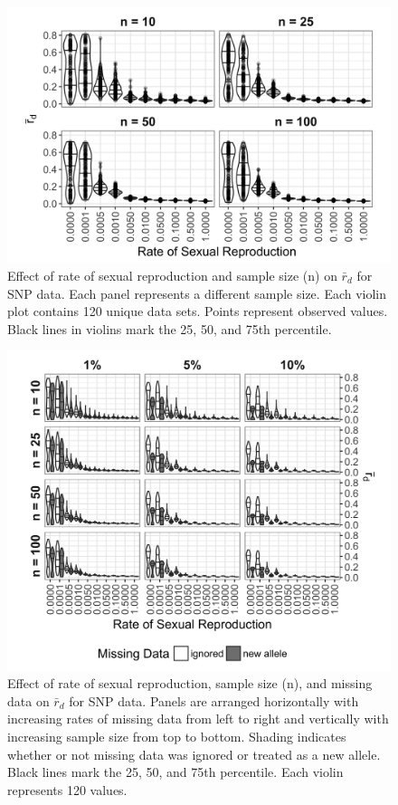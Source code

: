 \documentclass[double,11pt]{beavtex}
\begin{document}
  \begin{figure}
  
  {\centering \includegraphics[width=0.8\linewidth]{figure/simulations/genomic_rd} 
  
  }
  
  \caption[Effect of rate of sexual reproduction and sample size on \(\bar{r}_d\)
  for SNP data.]{Effect of rate of sexual reproduction and sample size (n) on
  \(\bar{r}_d\) for SNP data. Each panel represents a different sample
  size. Each violin plot contains 120 unique data sets. Points represent
  observed values. Black lines in violins mark the 25, 50, and 75th
  percentile.}\label{fig:sim5}
  \end{figure}
  
  \begin{figure}
  
  {\centering \includegraphics[width=0.8\linewidth]{figure/simulations/genomic_missing} 
  
  }
  
  \caption[Effect of rate of sexual reproduction, sample size, and missing data on
  \(\bar{r}_d\) for SNP data.]{Effect of rate of sexual reproduction, sample size (n), and missing data
  on \(\bar{r}_d\) for SNP data. Panels are arranged horizontally with
  increasing rates of missing data from left to right and vertically with
  increasing sample size from top to bottom. Shading indicates whether or
  not missing data was ignored or treated as a new allele. Black lines
  mark the 25, 50, and 75th percentile. Each violin represents 120 values.}\label{fig:simmisssnp}
  \end{figure}
  
\end{document}

